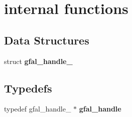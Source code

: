 \section{internal functions}
\label{group__internal__group}
\subsection*{Data Structures}
\begin{CompactItemize}
\item 
struct \textbf{gfal\_\-handle\_\-}
\end{CompactItemize}
\subsection*{Typedefs}
\begin{CompactItemize}
\item 
typedef gfal\_\-handle\_\- $\ast$ \textbf{gfal\_\-handle}\label{group__internal__group_g2d77c8b47f658f36507a7ddfeaa01559}

\end{CompactItemize}
